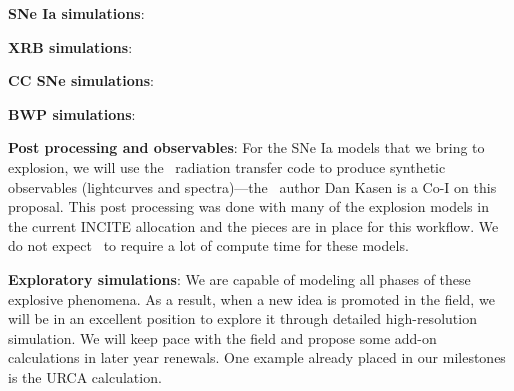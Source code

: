 {\bf SNe Ia simulations}:  


{\bf XRB simulations}:


{\bf CC SNe simulations}:


{\bf BWP simulations}:

{\bf Post processing and observables}:  
%
For the SNe Ia models that we bring to explosion, we will use the
\sedona\ radiation transfer code to produce synthetic observables
(lightcurves and spectra)---the \sedona\ author Dan Kasen is a Co-I on
this proposal.  This post processing was done with many of the explosion 
models in the current INCITE allocation and the pieces are in place for this
workflow. We do not expect \sedona\ to require a lot of compute
time for these models.


{\bf Exploratory simulations}:
%
We are
capable of modeling all phases of these explosive phenomena.  As a
result, when a new idea is promoted in the field, we will be in an
excellent position to explore it through detailed high-resolution
simulation.  We will keep pace with the field and propose some add-on
calculations in later year renewals.  One example already placed in
our milestones is the URCA calculation.



